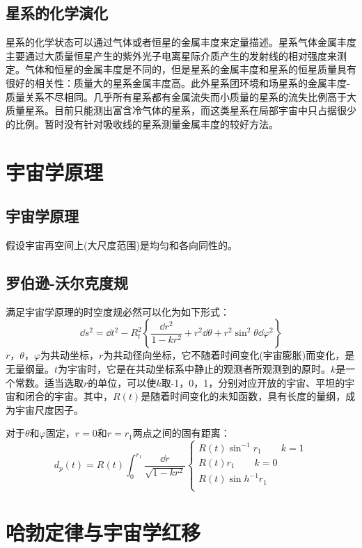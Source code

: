 \subsection{星系的化学演化}星系的化学状态可以通过气体或者恒星的金属丰度来定量描述。星系气体金属丰度主要通过大质量恒星产生的紫外光子电离星际介质产生的发射线的相对强度来测定。气体和恒星的金属丰度是不同的，但是星系的金属丰度和星系的恒星质量具有很好的相关性：质量大的星系金属丰度高。此外星系团环境和场星系的金属丰度-质量关系不尽相同。几乎所有星系都有金属流失而小质量的星系的流失比例高于大质量星系。目前只能测出富含冷气体的星系，而这类星系在局部宇宙中只占据很少的比例。暂时没有针对吸收线的星系测量金属丰度的较好方法。
\section{宇宙学原理}
\subsection{宇宙学原理}假设宇宙再空间上(大尺度范围)是均匀和各向同性的。
\subsection{罗伯逊-沃尔克度规}满足宇宙学原理的时空度规必然可以化为如下形式：
\begin{equation}
	\dd s^2=\dd t^2-R_{t}^2\left\{\frac{\dd r^2}{1-kr^2}+r^2\dd \theta +r^2\sin^2\theta\dd \varphi^2\right\}
\end{equation}
$r$，$\theta$，$\varphi$为共动坐标，$r$为共动径向坐标，它不随着时间变化(宇宙膨胀)而变化，是无量纲量。$t$为宇宙时，它是在共动坐标系中静止的观测者所观测到的原时。$k$是一个常数。适当选取$r$的单位，可以使$k$取-1，0，1，分别对应开放的宇宙、平坦的宇宙和闭合的宇宙。其中，$R(t)$是随着时间变化的未知函数，具有长度的量纲，成为宇宙尺度因子。

对于$\theta$和$\varphi$固定，$r=0$和$r=r_{1}$两点之间的固有距离：
\begin{equation}
	d_{p}(t)=R(t)\int_{0}^{r_{1}}\frac{\dd r}{\sqrt{1-kr^2}}
	\left\{
	\begin{aligned}
		R(t)\sin^{-1}r_{1}\qquad k=1\\
		R(t)r_{1}\qquad k=0\\
		R(t)\sin h^{-1}r_{1}\\
	\end{aligned}
	\right.
\end{equation}
\section{哈勃定律与宇宙学红移}
